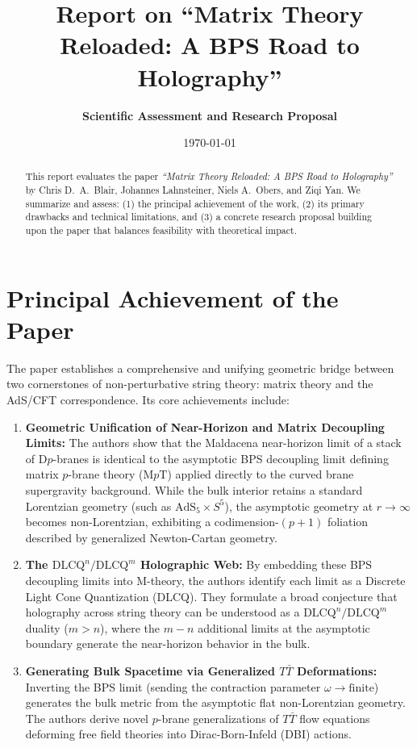 \documentclass[11pt,a4paper]{article}
\title{\textbf{Report on ``Matrix Theory Reloaded: A BPS Road to Holography''}}
\author{\textbf{Scientific Assessment and Research Proposal}}
\date{\today}
\begin{document}
\maketitle

\begin{abstract}
This report evaluates the paper \emph{``Matrix Theory Reloaded: A BPS Road to Holography''} by Chris D.~A.~Blair, Johannes Lahnsteiner, Niels A.~Obers, and Ziqi Yan. We summarize and assess: (1) the principal achievement of the work, (2) its primary drawbacks and technical limitations, and (3) a concrete research proposal building upon the paper that balances feasibility with theoretical impact.
\end{abstract}

\section{Principal Achievement of the Paper}

The paper establishes a comprehensive and unifying geometric bridge between two cornerstones of non-perturbative string theory: matrix theory and the AdS/CFT correspondence. Its core achievements include:
\begin{enumerate}
    \item \textbf{Geometric Unification of Near-Horizon and Matrix Decoupling Limits:} The authors show that the Maldacena near-horizon limit of a stack of $\text{D}p$-branes is identical to the asymptotic BPS decoupling limit defining matrix $p$-brane theory ($\text{M}p\text{T}$) applied directly to the curved brane supergravity background. While the bulk interior retains a standard Lorentzian geometry (such as $\text{AdS}_5 \times S^5$), the asymptotic geometry at $r \to \infty$ becomes non-Lorentzian, exhibiting a codimension-$(p+1)$ foliation described by generalized Newton-Cartan geometry.
    \item \textbf{The $\text{DLCQ}^n/\text{DLCQ}^m$ Holographic Web:} By embedding these BPS decoupling limits into M-theory, the authors identify each limit as a Discrete Light Cone Quantization (DLCQ). They formulate a broad conjecture that holography across string theory can be understood as a $\text{DLCQ}^n/\text{DLCQ}^m$ duality ($m > n$), where the $m-n$ additional limits at the asymptotic boundary generate the near-horizon behavior in the bulk.
    \item \textbf{Generating Bulk Spacetime via Generalized $T\bar{T}$ Deformations:} Inverting the BPS limit (sending the contraction parameter $\omega \to \text{finite}$) generates the bulk metric from the asymptotic flat non-Lorentzian geometry. The authors derive novel $p$-brane generalizations of $T\bar{T}$ flow equations deforming free field theories into Dirac-Born-Infeld (DBI) actions.
\end{enumerate}
\end{document}
